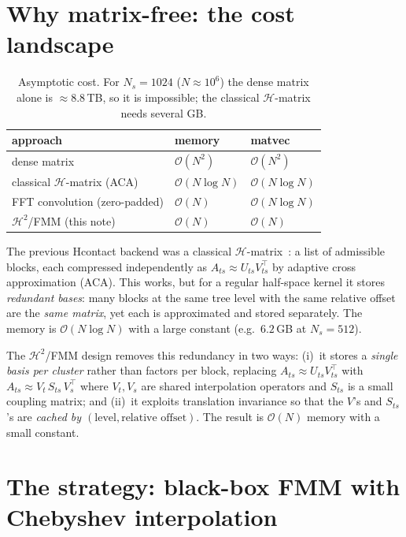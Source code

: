 \documentclass[11pt,a4paper]{article}
\newcommand{\Order}{\mathcal{O}}
\begin{document}
\section{Why matrix-free: the cost landscape}

\begin{table}[h]
\centering
\begin{tabular}{lll}
\toprule
approach & memory & matvec \\
\midrule
dense matrix                       & $\Order(N^2)$        & $\Order(N^2)$ \\
classical $\mathcal{H}$-matrix (ACA) & $\Order(N\log N)$  & $\Order(N\log N)$ \\
FFT convolution (zero-padded)      & $\Order(N)$          & $\Order(N\log N)$ \\
$\mathcal{H}^2$/FMM (this note)    & $\Order(N)$          & $\Order(N)$ \\
\bottomrule
\end{tabular}
\caption{Asymptotic cost. For $N_s=1024$ ($N\approx10^6$) the dense matrix
alone is $\approx 8.8$\,TB, so it is impossible; the classical
$\mathcal{H}$-matrix needs several GB.}
\end{table}

The previous Hcontact backend was a classical $\mathcal{H}$-matrix~\cite{Hackbusch2015}:
a list of admissible blocks, each compressed independently as $A_{ts}\approx U_{ts}
V_{ts}^\top$ by adaptive cross approximation (ACA). This works, but for a
regular half-space kernel it stores \emph{redundant bases}: many blocks at
the same tree level with the same relative offset are the \emph{same matrix},
yet each is approximated and stored separately. The memory is
$\Order(N\log N)$ with a large constant (e.g.\ $6.2$\,GB at $N_s=512$).

The $\mathcal{H}^2$/FMM design removes this redundancy in two ways:
(i)~it stores a \emph{single basis per cluster} rather than factors per
block, replacing $A_{ts}\approx U_{ts}V_{ts}^\top$ with
$A_{ts}\approx V_t\, S_{ts}\, V_s^\top$ where $V_t,V_s$ are shared
interpolation operators and $S_{ts}$ is a small coupling matrix; and
(ii)~it exploits translation invariance so that the $V$'s and $S_{ts}$'s are
\emph{cached by $(\text{level},\text{relative offset})$}. The result is
$\Order(N)$ memory with a small constant.

\section{The strategy: black-box FMM with Chebyshev interpolation}
\end{document}
